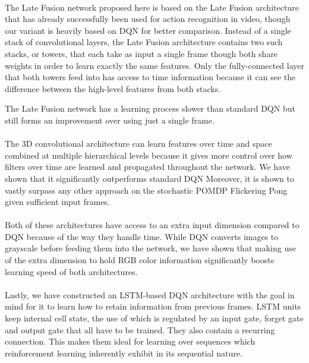\paragraph{}
The Late Fusion network proposed here
is based on the Late Fusion architecture
that has already successfully been used
for action recognition in video,
though our variant is heavily based on DQN
for better comparison.
Instead of a single stack of convolutional layers,
the Late Fusion architecture contains
two such stacks, or towers, that each take as input a single frame
though both share weights in order to learn exactly the same features.
Only the fully-connected layer
that both towers feed into
has access to time information
because it can see
the difference between the high-level features
from both stacks.

The Late Fusion network
has a learning process slower than standard DQN
but still forms an improvement over using
just a single frame.

\paragraph{}
The 3D convolutional architecture can
learn features over time and space combined
at multiple hierarchical levels
because it gives more control over how
filters over time are learned and propagated throughout the network.
We have shown that it significantly outperforms standard DQN
Moreover,
it is shown to vastly surpass any other approach
on the stochastic POMDP
Flickering Pong
given sufficient input frames.

\paragraph{}
Both of these architectures have access to an extra input dimension
compared to DQN because of the way they handle time.
While DQN converts images to grayscale before feeding them
into the network,
we have shown that making use of the extra dimension
to hold RGB color information
significantly boosts learning speed
of both architectures.

\paragraph{}
Lastly,
we have constructed an LSTM-based DQN architecture
with the goal in mind for it to learn how to retain
information from previous frames.
LSTM units keep internal cell state,
the use of which is regulated by
an input gate, forget gate and output gate
that all have to be trained.
They also contain a recurring connection.
This makes them ideal for learning over sequences
which reinforcement learning inherently exhibit
in its sequential nature.


